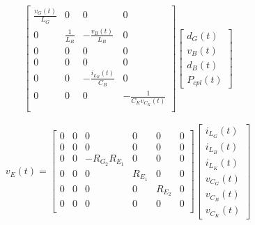 \documentclass{article}
\newcommand{\ds}{\displaystyle}
\begin{document}
\begin{gather}
  \begin{bmatrix}
    \ds \frac{v_G(t)}{L_G} & 0                 & 0                            & 0                              \\[12pt]
    0                      & \ds \frac{1}{L_B} & \ds - \frac{v_B(t)}{L_B}     & 0                              \\[12pt]
    0                      & 0                 & 0                            & 0                              \\[12pt]
    0                      & 0                 & 0                            & 0                              \\[12pt]
    0                      & 0                 & - \ds \frac{i_{L_B}(t)}{C_B} & 0                              \\[12pt]
    0                      & 0                 & 0                            & - \ds \frac{1}{C_K v_{C_K}(t)} \\[12pt]
  \end{bmatrix}
  \begin{bmatrix}
    d_G(t) \\ v_B(t) \\ d_B(t) \\ P_{cpl}(t)
  \end{bmatrix}
\end{gather}

\begin{equation}
  v_E(t) = 
  \begin{bmatrix}
    0 & 0 & 0 & 0 & 0 & 0 \\[12pt]
    0 & 0 & 0 & 0 & 0 & 0 \\[12pt]
    0 & 0 & - R_{G_2} R_{E_1} & 0 & 0 & 0 \\[12pt]
    0 & 0 & 0 & R_{E_1} & 0 & 0 \\[12pt]
    0 & 0 & 0 & 0 &  R_{E_2} & 0 \\[12pt]
    0 & 0 & 0 & 0 & 0 & 0 \\[12pt]
  \end{bmatrix}
  \begin{bmatrix}
    i_{L_G}(t) \\[12pt] i_{L_B}(t) \\[12pt] i_{L_K}(t) \\[12pt]
    v_{C_G}(t) \\[12pt] v_{C_B}(t) \\[12pt] v_{C_K}(t)
  \end{bmatrix}
\end{equation}
\end{document}
